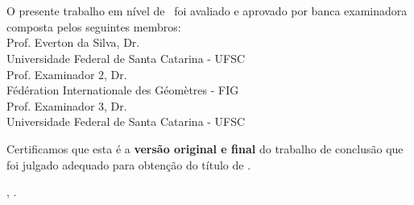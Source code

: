 \documentclass[
	12pt,				%
	oneside,			%
	a4paper,			%
	chapter=TITLE,		%
	section=TITLE,		%
	english,			%
	brazil				%
	]{abntex2}
\begin{document}
\begin{folhadeaprovacao}
	\OnehalfSpacing
	\centering
	\imprimirautor\\%
	\vspace*{10pt}		
	\textbf{\imprimirtitulo}%
	\ifnotempty{\imprimirsubtitulo}{:~\imprimirsubtitulo}\\%
	\vspace*{\baselineskip}
	O presente trabalho em nível de \imprimirnivel~foi avaliado e aprovado por banca examinadora composta pelos seguintes membros:\\
	\vspace*{\baselineskip}
    Prof. Everton da Silva, Dr.\\
  Universidade Federal de Santa Catarina - UFSC\\
  \vspace*{\baselineskip}
    Prof. Examinador 2, Dr.\\
  Fédération Internationale des Géomètres - FIG\\
  \vspace*{\baselineskip}
    Prof. Examinador 3, Dr.\\
  Universidade Federal de Santa Catarina - UFSC\\
  \vspace*{\baselineskip}
    
	\vspace*{2\baselineskip}
	\begin{minipage}{\textwidth}
		Certificamos que esta é a \textbf{versão original e final} do trabalho de conclusão que foi julgado adequado para obtenção do título de \imprimirformacao.\\
	\end{minipage}
	\vspace*{\fill}
	\vspace*{\fill}
	\assinatura{\OnehalfSpacing\imprimirorientador \\ \imprimirorientadorRotulo}
	\vspace*{\fill}
	\imprimirlocal, \imprimirano.
\end{folhadeaprovacao}
\end{document}
